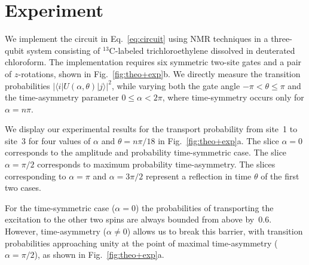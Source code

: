 \documentclass[aps,prx,10pt,
               superscriptaddress,
               twocolumn,
               longbibliography,
showpacs]{revtex4-1}
\theoremstyle{plain}
\theoremstyle{definition}
\newcommand{\bra}[1]{\mbox{$\langle #1|$}}
\newcommand{\ket}[1]{\ensuremath{|#1\rangle}}
\begin{document}
\section{Experiment}
\label{sec:methods}

We implement the circuit in Eq.~\eqref{eq:circuit} using NMR techniques in a three-qubit system consisting of
$^{13}$C-labeled trichloroethylene dissolved in deuterated chloroform.
The implementation requires six symmetric two-site gates and a pair of $z$-rotations, shown in Fig.~\ref{fig:theo+exp}b.
We directly measure the transition
probabilities $|\bra{i} U(\alpha, \theta) \ket{j}|^2$,
while varying both the gate angle $-\pi< \theta \leq \pi$ and the
time-asymmetry parameter $0 \leq \alpha < 2 \pi$,
where time-symmetry occurs only for $\alpha = n \pi$.

We display our experimental results
for the transport probability from site~1 to site~3
for four values of $\alpha$ and
$\theta= n \pi/18$ in Fig.~\ref{fig:theo+exp}a.  The slice $\alpha = 0$
corresponds to the amplitude and probability
time-symmetric case. The slice $\alpha = \pi/2$ corresponds to maximum probability time-asymmetry.
The slices corresponding to $\alpha=\pi$ and $\alpha=3\pi/2$ represent
a reflection in time $\theta$ of the first two cases.

For the time-symmetric case ($\alpha = 0$) the probabilities of
transporting the excitation to the other two spins are always bounded
from above by~$0.6$.
However, time-asymmetry ($\alpha \neq 0$) allows us to break this
barrier, with transition probabilities approaching unity at
the point of maximal time-asymmetry ($\alpha = \pi/2$),
as shown in Fig.~\ref{fig:theo+exp}a.

\begin{comment}
In the time-symmetric case, we
cannot break time-symmetry because of the palindromic circuit structure in
Fig.~\ref{fig:theo+exp}b.
The experimental data
depicted in the first column of Fig.~\ref{fig:exp} (corresponding to
$\alpha=0,\pi$) illustrates a
good match between theory and experiment.
The top left panel shows that the probabilities of finding the
excitation at spin~2 or spin~3 are always below~$0.6$.
In the third panel of the first column, since time symmetry
cannot be broken under the time-symmetric Hamiltonian, we obtained essentially
the same plot as the left one.

The same gate sequence with $\alpha=\pi/2, 3\pi/2$ results in a large
enhancement of the transport probability.
On the second and fourth panels of Fig.~\ref{fig:exp},
we see that the probabilities of encountering
the excitation in spin~2 or spin~3 approach unity, seen in both
theory and experiment.  Moreover, time-symmetry is again broken by applying
the time-reversed evolution.
\end{comment}
\end{document}
